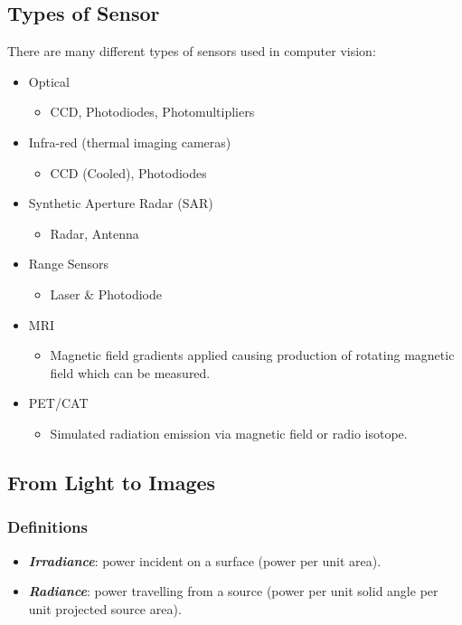 \documentclass{article}\author{Hawley, Adam}
\begin{document}
\subsection{Types of Sensor}
There are many different types of sensors used in computer vision:
\begin{itemize}
	\item Optical
	\begin{itemize} \item CCD, Photodiodes, Photomultipliers \end{itemize}
	\item Infra-red (thermal imaging cameras)
	\begin{itemize} \item CCD (Cooled), Photodiodes \end{itemize}
	\item Synthetic Aperture Radar (SAR)
	\begin{itemize} \item Radar, Antenna \end{itemize}
	\item Range Sensors
	\begin{itemize} \item Laser \& Photodiode \end{itemize}
	\item MRI
	\begin{itemize} \item Magnetic field gradients applied causing production of rotating magnetic field which can be measured. \end{itemize}
	\item PET/CAT
	\begin{itemize} \item Simulated radiation emission via magnetic field or radio isotope. \end{itemize}
\end{itemize}
\subsection{From Light to Images}
\subsubsection{Definitions}
\begin{itemize}
	\item {\textit{\textbf {Irradiance}}}: power incident on a surface (power per unit area).
	\item {\textit{\textbf {Radiance}}}: power travelling from a source (power per unit solid angle per unit projected source area).
\end{itemize}
\end{document}
